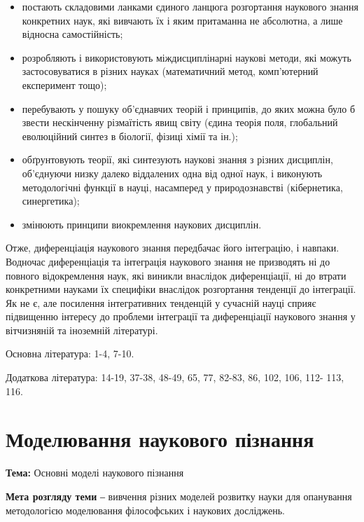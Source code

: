 \begin{itemize}
	\item постають складовими ланками єдиного ланцюга розгортання наукового
	знання конкретних наук, які вивчають їх і яким притаманна не абсолютна, а
	лише відносна самостійність;
	
	\item розробляють і використовують міждисциплінарні наукові методи, які
	можуть застосовуватися в різних науках (математичний метод, комп’ютерний
	експеримент тощо);

	\item перебувають у пошуку об’єднавчих теорій і принципів, до яких можна
	було б звести нескінченну різмаїтість явищ світу (єдина теорія поля,
	глобальний еволюційний синтез в біології, фізиці хімії та ін.);

	\item обґрунтовують теорії, які синтезують наукові знання з різних дисциплін,
	об’єдную\-чи низку далеко віддалених одна від одної наук, і виконують
	методологічні функції в науці, насамперед у природознавстві (кібернетика,
	синергетика);

	\item змінюють принципи виокремлення наукових дисциплін.
\end{itemize}

Отже, диференціація наукового знання передбачає його інтеграцію, і
навпаки. Водночас диференціація та інтеграція наукового знання не призводять
ні до повного відокремлення наук, які виникли внаслідок диференціації, ні до
втрати конкретними науками їх специфіки внаслідок розгортання тенденції до
інтеграції. Як не є, але посилення інтегративних тенденцій у сучасній науці
сприяє підвищенню інтересу до проблеми інтеграції та диференціації наукового
знання у вітчизняній та іноземній літературі.

Основна література: 1-4, 7-10.

Додаткова література: 14-19, 37-38, 48-49, 65, 77, 82-83, 86, 102, 106, 112-
113, 116.

\section{Моделювання наукового пізнання}

\textbf{Тема:} Основні моделі наукового пізнання

\textbf{Мета розгляду теми} ‒ вивчення різних моделей розвитку науки для
опанування методологією моделювання філософських і наукових досліджень.


